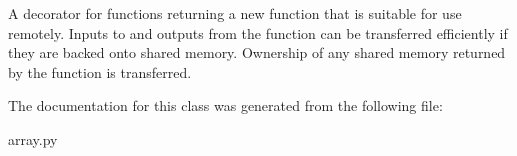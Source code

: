\label{classseren3_1_1array_1_1RemoteKeyboardInterrupt_a465c9a54d5b8b38699014c9d4dca8b35}
\begin{DoxyVerb}A decorator for functions returning a new function that is
suitable for use remotely. Inputs to and outputs from the function
can be transferred efficiently if they are backed onto shared
memory. Ownership of any shared memory returned by the function
is transferred.\end{DoxyVerb}
 

The documentation for this class was generated from the following file:\begin{DoxyCompactItemize}
\item 
array.py\end{DoxyCompactItemize}
